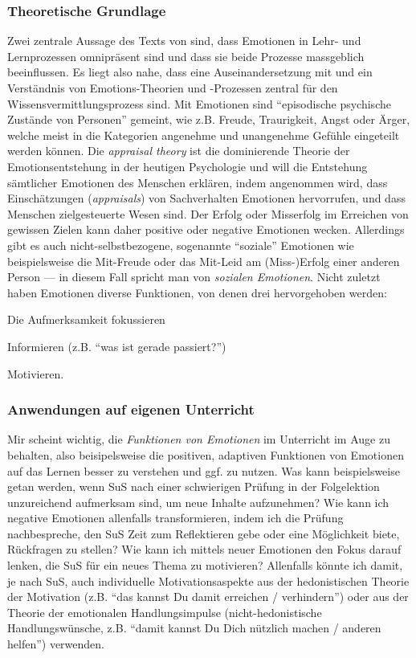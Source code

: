 \begin{myExBox}[title=Aspekt 3: Emotionen verstehen und nutzen]
\subsubsection*{Theoretische Grundlage}
Zwei zentrale Aussage des Texts von \textcite{alma99116838938605511} sind, dass Emotionen in Lehr- und Lernprozessen omnipräsent sind und dass sie beide Prozesse massgeblich beeinflussen. Es liegt also nahe, dass eine Auseinandersetzung mit und ein Verständnis von Emotions-Theorien und -Prozessen zentral für den Wissensvermittlungsprozess sind. Mit Emotionen sind ``episodische psychische Zustände von Personen'' gemeint, wie z.B. Freude, Traurigkeit, Angst oder Ärger, welche meist in die Kategorien angenehme und unangenehme Gefühle eingeteilt werden können. Die \textit{appraisal theory} ist die dominierende Theorie der Emotionsentstehung in der heutigen Psychologie und will die Entstehung sämtlicher Emotionen des Menschen erklären, indem angenommen wird, dass Einschätzungen (\textit{appraisals}) von Sachverhalten Emotionen hervorrufen, und dass Menschen zielgesteuerte Wesen sind. Der Erfolg oder Misserfolg im Erreichen von gewissen Zielen kann daher positive oder negative Emotionen wecken. Allerdings gibt es auch nicht-selbstbezogene, sogenannte ``soziale'' Emotionen wie beispielsweise die Mit-Freude oder das Mit-Leid am (Miss-)Erfolg einer anderen Person --- in diesem Fall spricht man von \textit{sozialen Emotionen}. Nicht zuletzt haben Emotionen diverse Funktionen, von denen drei hervorgehoben werden: \begin{enumerate*}
\item Die Aufmerksamkeit fokussieren
\item Informieren (z.B. ``was ist gerade passiert?'')
\item Motivieren.
\end{enumerate*}

\subsubsection*{Anwendungen auf eigenen Unterricht}
Mir scheint wichtig, die \textit{Funktionen von Emotionen} im Unterricht im Auge zu behalten, also beisipelsweise die positiven, adaptiven Funktionen von Emotionen auf das Lernen besser zu verstehen und ggf. zu nutzen. Was kann beispielsweise getan werden, wenn SuS nach einer schwierigen Prüfung in der Folgelektion unzureichend aufmerksam sind, um neue Inhalte aufzunehmen? Wie kann ich negative Emotionen allenfalls transformieren, indem ich die Prüfung nachbespreche, den SuS Zeit zum Reflektieren gebe oder eine Möglichkeit biete, Rückfragen zu stellen? Wie kann ich mittels neuer Emotionen den Fokus darauf lenken, die SuS für ein neues Thema zu motivieren? Allenfalls könnte ich damit, je nach SuS, auch individuelle Motivationsaspekte aus der hedonistischen Theorie der Motivation (z.B. ``das kannst Du damit erreichen / verhindern'') oder aus der Theorie der emotionalen Handlungsimpulse (nicht-hedonistische Handlungswünsche, z.B. ``damit kannst Du Dich nützlich machen / anderen helfen'') verwenden.\end{myExBox}

